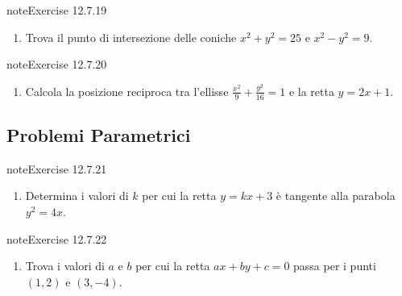 \documentclass[letterpaper,10pt,italian]{jupyterBook}
\begin{document}
\begin{sphinxadmonition}{note}{Exercise 12.7.19}


\begin{enumerate}
%
\setcounter{enumi}{18}
\item {} 
\sphinxAtStartPar
Trova il punto di intersezione delle coniche \( x^2 + y^2 = 25 \) e \( x^2 - y^2 = 9 \).

\end{enumerate}
\end{sphinxadmonition}
 \label{exercise:ch/analytic_geometry/analytic_geometry_2d/sol-exercise-19}

\begin{sphinxadmonition}{note}{Exercise 12.7.20}


\begin{enumerate}
%
\setcounter{enumi}{19}
\item {} 
\sphinxAtStartPar
Calcola la posizione reciproca tra l’ellisse \( \frac{x^2}{9} + \frac{y^2}{16} = 1 \) e la retta \( y = 2x + 1 \).

\end{enumerate}
\end{sphinxadmonition}


\subsection{Problemi Parametrici}
\label{\detokenize{ch/analytic_geometry/analytic_geometry_2d/sol:problemi-parametrici}} \label{exercise:ch/analytic_geometry/analytic_geometry_2d/sol-exercise-20}

\begin{sphinxadmonition}{note}{Exercise 12.7.21}


\begin{enumerate}
%
\setcounter{enumi}{20}
\item {} 
\sphinxAtStartPar
Determina i valori di \( k \) per cui la retta \( y = kx + 3 \) è tangente alla parabola \( y^2 = 4x \).

\end{enumerate}
\end{sphinxadmonition}
 \label{exercise:ch/analytic_geometry/analytic_geometry_2d/sol-exercise-21}

\begin{sphinxadmonition}{note}{Exercise 12.7.22}


\begin{enumerate}
%
\setcounter{enumi}{21}
\item {} 
\sphinxAtStartPar
Trova i valori di \( a \) e \( b \) per cui la retta \( ax + by + c = 0 \) passa per i punti \( (1, 2) \) e \( (3, -4) \).

\end{enumerate}
\end{sphinxadmonition}
 \label{exercise:ch/analytic_geometry/analytic_geometry_2d/sol-exercise-22}
\end{document}

